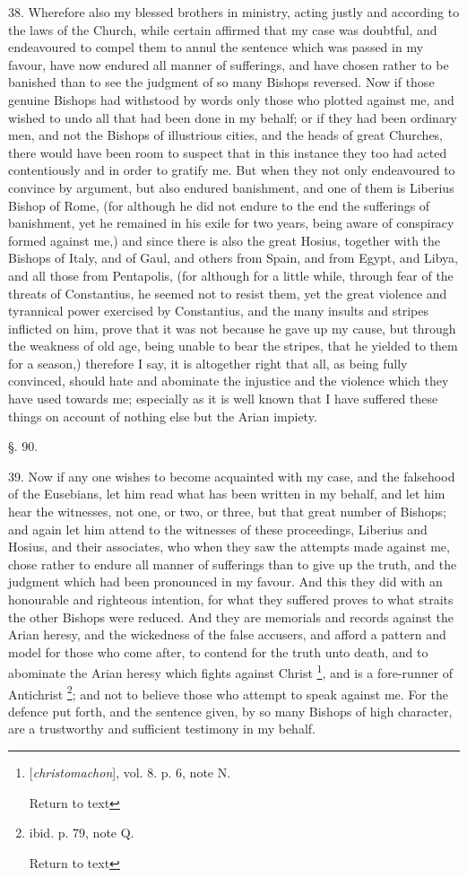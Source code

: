 38. Wherefore also my blessed brothers in
ministry, acting justly and according to the laws of the Church, while
certain affirmed that my case was doubtful, and endeavoured to
compel them to annul the sentence which was passed in my favour, have
now endured all manner of sufferings, and have chosen rather to be
banished than to see the judgment of so many Bishops reversed. Now if
those genuine Bishops had withstood by words only those who plotted
against me, and wished to undo all that had been done in my behalf; or
if they had been ordinary men, and not the Bishops of illustrious
cities, and the heads of great Churches, there would have been room to
suspect that in this instance they too had acted contentiously and in
order to gratify me. But when they not only endeavoured to convince by
argument, but also endured banishment, and one of them is Liberius
Bishop of Rome, (for although he did not endure to the end the
sufferings of banishment, yet he remained in his exile for two years,
being aware of conspiracy formed against me,) and since there is also
the great Hosius, together with the Bishops of Italy, and of Gaul, and
others from Spain, and from Egypt, and Libya, and all those from
Pentapolis, (for although for a little while, through fear of the
threats of Constantius, he seemed not to resist them, yet the great
violence and tyrannical power exercised by Constantius, and the many
insults and stripes inflicted on him, prove that it was not because he
gave up my cause, but through the weakness of old age, being unable to
bear the stripes, that he yielded to them for a season,) therefore I
say, it is altogether right that all, as being fully convinced, should
hate and abominate the injustice and the violence which they have used
towards me; especially as it is well known that I have suffered these
things on account of nothing else but the Arian impiety.

§. 90.

39. Now if any one wishes to become acquainted
with my case, and the falsehood of the Eusebians, let him read what
has been written in my behalf, and let him hear the witnesses, not
one, or two, or three, but that great number of Bishops; and again let
him attend to the witnesses of these proceedings, Liberius and Hosius,
and their associates, who when they saw the attempts made against me,
chose rather to endure all manner of sufferings than to give up the
truth, and the judgment which had been pronounced in my favour. And this they did with an honourable and righteous intention, for what
they suffered proves to what straits the other Bishops were reduced.
And they are memorials and records against the Arian heresy, and the
wickedness of the false accusers, and afford a pattern and model for
those who come after, to contend for the truth unto death, and to
abominate the Arian heresy which fights against Christ \footnote{[\emph{christomachon}], vol. 8. p. 6, note N.

Return to text}, and is a fore-runner of Antichrist \footnote{ibid. p. 79, note Q.

Return to text}; and not to believe those who attempt to speak against me. For
the defence put forth, and the sentence given, by so many Bishops of
high character, are a trustworthy and sufficient testimony in my
behalf.


